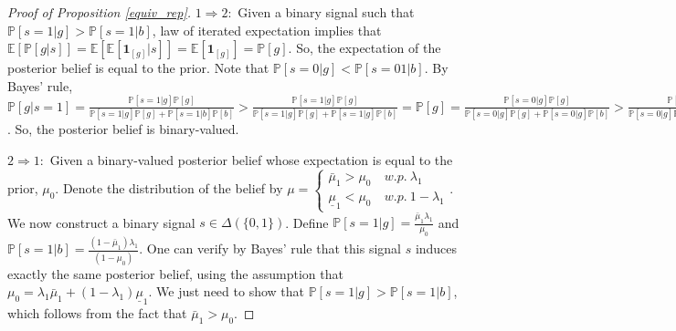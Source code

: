 \documentclass[11pt]{extarticle}
\newcommand{\ra}{\Rightarrow}
\begin{document}
\begin{proof}[Proof of Proposition \ref{equiv_rep}]
	$1 \ra 2:$	Given a binary signal such that $\mathbb{P}[s=1\vert g] > \mathbb{P}[s=1\vert b]$, law of iterated expectation implies that $\mathbb{E}[\mathbb{P}[g\vert s]] = \mathbb{E}[\mathbb{E}[\mathbf{1}_{[g]}\vert s]] = \mathbb{E}[\mathbf{1}_{[g]}] = \mathbb{P}[g]$. So, the expectation of the posterior belief is equal to the prior. Note that $\mathbb{P}[s=0\vert g] < \mathbb{P}[s=01\vert b]$. By Bayes' rule, $\mathbb{P}[g \vert s=1] = \frac{\mathbb{P}[s=1\vert g] \mathbb{P}[g]}{\mathbb{P}[s=1\vert g] \mathbb{P}[g]+\mathbb{P}[s=1\vert b] \mathbb{P}[b]} > \frac{\mathbb{P}[s=1\vert g] \mathbb{P}[g]}{\mathbb{P}[s=1\vert g] \mathbb{P}[g]+\mathbb{P}[s=1\vert g] \mathbb{P}[b]} = \mathbb{P}[g] = \frac{\mathbb{P}[s=0\vert g] \mathbb{P}[g]}{\mathbb{P}[s=0\vert g] \mathbb{P}[g]+\mathbb{P}[s=0\vert g] \mathbb{P}[b]} > \frac{\mathbb{P}[s=0\vert g] \mathbb{P}[g]}{\mathbb{P}[s=0\vert g] \mathbb{P}[g]+\mathbb{P}[s=0\vert b] \mathbb{P}[b]} = \mathbb{P}[g \vert s=0]$. So, the posterior belief is binary-valued.
	
	$2 \ra 1:$ Given a binary-valued posterior belief whose expectation is equal to the prior, $\mu_0$. Denote the distribution of the belief by $\mu = \begin{cases}
	\bar{\mu}_1 > \mu_0&~w.p.~\lambda_1\\
	\underline{\mu}_1 < \mu_0&~w.p.~1-\lambda_1
	\end{cases}$. We now construct a binary signal $s \in \Delta(\{0,1\})$. Define $\mathbb{P}[s=1\vert g] = \frac{\bar{\mu}_1 \lambda_{1}}{\mu_0}$ and $\mathbb{P}[s=1\vert b] = \frac{(1-\bar{\mu}_1) \lambda_{1}}{(1-\mu_0)}$. One can verify by Bayes' rule that this signal $s$ induces exactly the same posterior belief, using the assumption that $\mu_0 = \lambda_1 \bar{\mu}_1 + (1-\lambda_1)\underline{\mu}_1$. We just need to show that $\mathbb{P}[s=1\vert g] > \mathbb{P}[s=1\vert b]$, which follows from the fact that $\bar{\mu}_1 > \mu_0$.
\end{proof}
\end{document}
